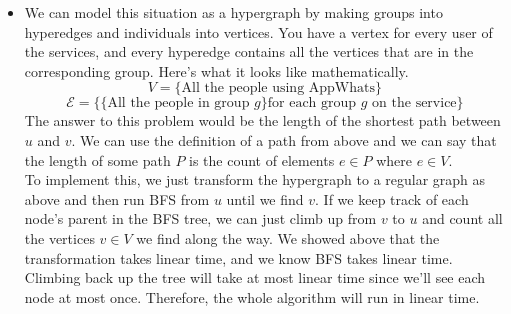 \documentclass[11pt]{article}
\begin{document}
\begin{solution}
\begin{itemize}
        \item We can model this situation as a hypergraph by making groups into hyperedges and individuals into vertices. You have a vertex for every user of the services, and every hyperedge contains all the vertices that are in the corresponding group. Here's what it looks like mathematically. 
            \[
                V = \{\text{All the people using AppWhats}\}
            \]
            \[
                \mathcal{E} = \{\{\text{All the people in group $g$}\} \text{for each group $g$ on the service}\}
            \]
            The answer to this problem would be the length of the shortest path between $u$ and $v$. We can use the definition of a path from above and we can say that the length of some path $P$ is the count of elements $e \in P$ where $e \in V$.
            \\ To implement this, we just transform the hypergraph to a regular graph as above and then run BFS from $u$ until we find $v$. If we keep track of each node's parent in the BFS tree, we can just climb up from $v$ to $u$ and count all the vertices $v \in V$ we find along the way. We showed above that the transformation takes linear time, and we know BFS takes linear time. Climbing back up the tree will take at most linear time since we'll see each node at most once. Therefore, the whole algorithm will run in linear time.
    \end{itemize}
\end{solution}

\end{document}
